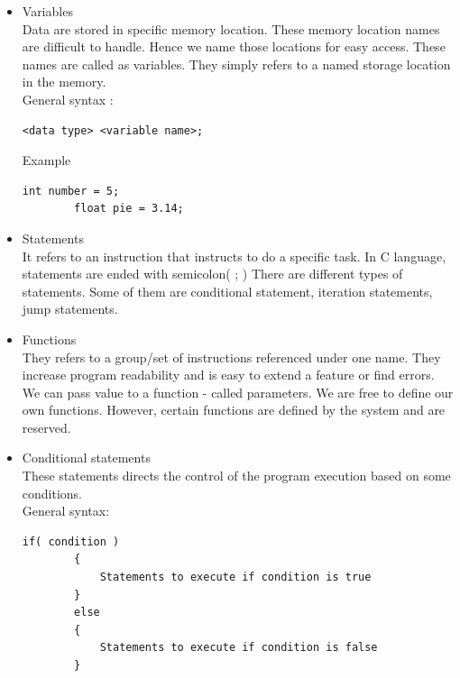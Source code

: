 \begin{itemize}
    \item Variables \\
    Data are stored in specific memory location. These memory location names are difficult to handle. Hence we name those locations for easy access. These names are called as variables. They simply refers to a named storage location in the memory.\\
    General syntax : 
    \begin{lstlisting}[style=CStyle]
        <data type> <variable name>;
    \end{lstlisting}
    Example
    \begin{lstlisting}[style=CStyle]
        int number = 5;
        float pie = 3.14;
    \end{lstlisting}
    
    \item Statements \\
    It refers to an instruction that instructs to do a specific task. In C language, statements are ended with semicolon( ; ) There are different types of statements. Some of them are conditional statement, iteration statements, jump statements.
    
    \item Functions \\
    They refers to a group/set of instructions referenced under one name. They increase program readability and is easy to extend a feature or find errors. We can pass value to a function - called parameters. We are free to define our own functions. However, certain functions are defined by the system and are reserved.
    
    \item Conditional statements \\
    These statements directs the control of the program execution based on some conditions.\\
    General syntax:
    \begin{lstlisting}[style=CStyle]
        if( condition ) 
        {
            Statements to execute if condition is true
        }
        else
        {
            Statements to execute if condition is false
        }
    \end{lstlisting}
    

\end{itemize}

